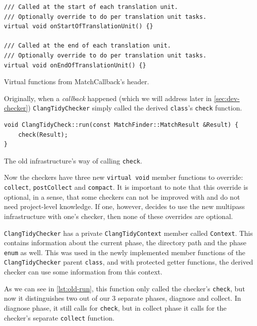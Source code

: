 \begin{listing}[H]
\begin{verbatim}
/// Called at the start of each translation unit.
/// Optionally override to do per translation unit tasks.
virtual void onStartOfTranslationUnit() {}

/// Called at the end of each translation unit.
/// Optionally override to do per translation unit tasks.
virtual void onEndOfTranslationUnit() {}
\end{verbatim}
\caption{Virtual functions from MatchCallback's header.}\label{lst:mc-single-virtual}
\end{listing}

Originally, when a \emph{callback} happened (which we will address later in \cref{sec:dev-checker})
\texttt{ClangTidyChecker} simply called the derived \texttt{class}'s \texttt{check} function.

\begin{listing}[H]
\begin{verbatim}
void ClangTidyCheck::run(const MatchFinder::MatchResult &Result) {
	check(Result);
}
\end{verbatim}
\caption{The old infrastructure's way of calling \texttt{check}.}\label{lst:old-run}
\end{listing}

Now the checkers have three new \texttt{virtual void} member functions to override: \texttt{collect}, \texttt{postCollect}
and \texttt{compact}.
It is important to note that this override is optional, in a sense, that some checkers can not be improved with and do not need
project-level knowledge. If one, however, decides to use the new multipass infrastructure with one's checker, then none of these overrides
are optional.

\texttt{ClangTidyChecker} has a private \texttt{ClangTidyContext} member called \texttt{Context}.
This contains information about the current phase, the directory path and the
phase \texttt{enum} as well. This was used in the newly implemented member functions of the \texttt{ClangTidyChecker}
parent \texttt{class}, and with protected getter functions, the derived checker can use some information from this context.


As we can see in \cref{lst:old-run}, this function only called the checker's \texttt{check}, but now it distinguishes two
out of our 3 separate
phases, diagnose and collect. In diagnose phase, it still calls for \texttt{check}, but in collect phase it calls
for the checker's separate \texttt{collect} function.

